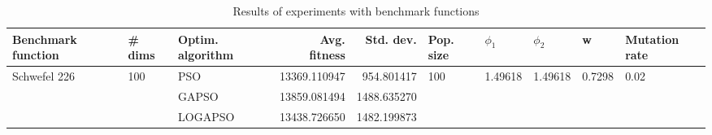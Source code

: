 \begin{table}
\centering
\caption{Results of experiments with benchmark functions}
\begin{tabular}{lllrrlllll}
\toprule
           Benchmark function &              \# dims & Optim. algorithm &  Avg. fitness &   Std. dev. &            Pop. size &               $\phi_{1}$ &               $\phi_{2}$ &                       w &         Mutation rate \\
\midrule
\multirow{3}{*}{Schwefel 226} & \multirow{3}{*}{100} &              PSO &  13369.110947 &  954.801417 & \multirow{3}{*}{100} & \multirow{3}{*}{1.49618} & \multirow{3}{*}{1.49618} & \multirow{3}{*}{0.7298} & \multirow{3}{*}{0.02} \\
                              &                      &            GAPSO &  13859.081494 & 1488.635270 &                      &                          &                          &                         &                       \\
                              &                      &          LOGAPSO &  13438.726650 & 1482.199873 &                      &                          &                          &                         &                       \\
\bottomrule
\end{tabular}
\end{table}

